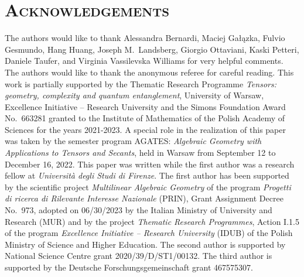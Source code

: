 \documentclass[a4paper,11pt,reqno]{amsart}
\numberwithin{equation}{section}
\theoremstyle{definition}
\theoremstyle{plain}
\theoremstyle{remark}
\begin{document}
\section*{\normalfont \scshape{}\selectfont Acknowledgements}
\noindent
The authors would like to thank Alessandra Bernardi, Maciej Ga{\l}{\k{a}}zka,
Fulvio Gesmundo, Hang Huang, Joseph
M.~Landsberg, Giorgio Ottaviani, Kaski Petteri, Daniele Taufer,
and Virginia Vassilevska Williams for very helpful comments. The authors would like to thank the anonymous referee for careful reading.
This work is partially supported by  the Thematic Research Programme
\textit{Tensors: geometry, complexity and quantum entanglement}, University of
Warsaw, Excellence Initiative – Research University and the Simons Foundation
Award No.~663281 granted to the Institute of Mathematics of the Polish Academy
of Sciences for the years 2021-2023.
A special role in the realization of this paper was taken by the semester program AGATES: \textit{Algebraic Geometry with Applications to Tensors and Secants}, held in Warsaw from September 12 to December 16, 2022. This paper was written while the first author was a research fellow at \textit{Università degli Studi di Firenze}. The first author has been supported by the scientific project \textit{Multilinear Algebraic Geometry} of the program \textit{Progetti di ricerca di Rilevante Interesse Nazionale} (PRIN), Grant Assignment Decree No.~973, adopted on 06/30/2023 by the Italian Ministry of University and Research (MUR) and by the project \textit{Thematic Research Programmes}, Action I.1.5 of the program \textit{Excellence Initiative -- Research University} (IDUB) of the Polish Ministry of Science and Higher Education.
The second author is supported by National Science Centre grant
2020/39/D/ST1/00132. The third author is supported by the Deutsche Forschungsgemeinschaft grant
467575307.
\end{document}
